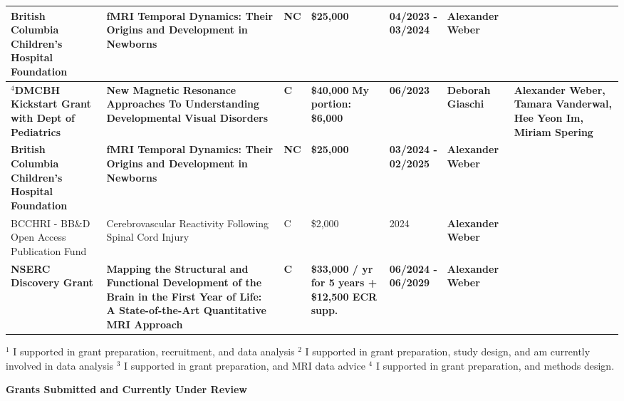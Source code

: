 \documentclass[11pt,notitlepage,english]{report}
\begin{document}
\begin{longtable}{|L{2.7cm}|L{4cm}|L{1cm}|L{2cm}|L{1.7cm}|L{2cm}|L{3cm}|}
  \hline
  \textbf{British Columbia Children's Hospital Foundation} & \textbf{fMRI Temporal Dynamics: Their Origins and Development in Newborns} & \textbf{NC} & \textbf{\$25,000} & \textbf{04/2023 - 03/2024} & \textbf{Alexander Weber} & \\
  \hline
  $^{4}$\textbf{DMCBH Kickstart Grant with Dept of Pediatrics} & \textbf{New Magnetic Resonance Approaches To Understanding Developmental Visual Disorders} & \textbf{C} & \textbf{\$40,000} \newline \textbf{My portion: \$6,000} & \textbf{06/2023} & \textbf{Deborah Giaschi} & \textbf{Alexander Weber, Tamara Vanderwal, Hee Yeon Im, Miriam Spering} \\
  \hline
  \textbf{British Columbia Children's Hospital Foundation} & \textbf{fMRI Temporal Dynamics: Their Origins and Development in Newborns} & \textbf{NC} & \textbf{\$25,000} & \textbf{03/2024 - 02/2025} & \textbf{Alexander Weber} & \\
  \hline
  BCCHRI - BB\&D Open Access Publication Fund & Cerebrovascular Reactivity Following Spinal Cord Injury & C & \$2,000 & 2024 & \textbf{Alexander Weber} & \\
  \hline
  \textbf{NSERC Discovery Grant} & \textbf{Mapping the Structural and Functional Development of the Brain in the First Year of Life: A State-of-the-Art Quantitative MRI Approach} & \textbf{C} & \textbf{\$33,000 / yr for 5 years \newline + \$12,500 ECR supp.} & \textbf{06/2024 - 06/2029} & \textbf{Alexander Weber} & \\
  \hline
\end{longtable}
\setlength\LTleft{0cm}
\setlength\LTright{0cm}
\noindent $^{1}$ I supported in grant preparation, recruitment, and data analysis \newline
$^{2}$ I supported in grant preparation, study design, and am currently involved in data analysis \newline
$^{3}$ I supported in grant preparation, and MRI data advice \newline
$^{4}$ I supported in grant preparation, and methods design.
\vspace{10pt}

\textbf{Grants Submitted and Currently Under Review}
\end{document}
